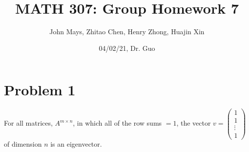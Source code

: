\documentclass[fleqn]{article}
\title{\textbf{MATH 307: Group Homework 7}}
\author{John Mays, Zhitao Chen, Henry Zhong, Huajin Xin}
\date{04/02/21, Dr. Guo}
\begin{document}

\maketitle

\section*{Problem 1}
For all matrices, $A^{m\times n}$, in which all of the row sums $=1$, the vector $v=\begin{pmatrix}1\\1\\ \vdots\\1\end{pmatrix}$ of dimension $n$ is an eigenvector.
\end{document}
